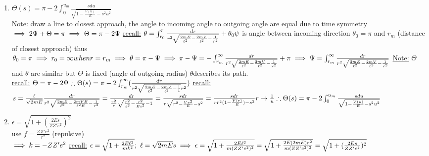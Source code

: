 \documentclass[12pt]{amsart}
\begin{document}
\begin{enumerate}
\item \underline{$\Theta (s) = \pi - 2 \int_0^{u_m} \frac{s du}{\sqrt{1- \frac{V(u)}{E} - s^2 u^2}}$}\\
\underline{Note:} draw a line to closest approach, the angle to incoming angle to outgoing angle are equal due to time symmetry\\
$\implies 2 \Psi + \Theta = \pi \implies \Theta = \pi - 2 \Psi\\$
\underline{recall:} $\theta = \int_{r_0}^r \frac{dr}{r^2 \sqrt{ \frac{2 m E}{\ell^2} - \frac{2 m V}{\ell^2} - \frac{1}{r^2}}}+ \theta_0\\
\psi$ is angle between incoming direction $\theta_0 = \pi$ and $r_m$ (distance of closest approach) thus\\
$\theta_0 = \pi \implies r_0 = \infty when r = r_m \implies \theta = \pi-\Psi\\
\implies \pi - \Psi = - \int_{r_m}^{\infty} \frac{dr}{r^2 \sqrt{ \frac{2 m E}{\ell^2} - \frac{2 m V}{\ell^2} - \frac{1}{r^2}}} + \pi\\
\implies \Psi = \int_{r_m}^{\infty} \frac{dr}{r^2 \sqrt{ \frac{2 m E}{\ell^2} - \frac{2 m V}{\ell^2} - \frac{1}{r^2}}}\\$
\underline{Note:} $\Theta$ and $\theta$ are similar but $\Theta$ is fixed (angle of outgoing radius) $\theta $describes its path.\\
\underline{recall:} $\Theta = \pi - 2 \Psi\\
\therefore \Theta(s) = \pi - 2 \int_{r_m}^{\infty} ( \frac{dr}{r^2 \sqrt{\frac{2 mE}{\ell^2} - \frac{2 m V}{\ell^2} - \frac[1}{r^2}})\\$
\underline{recall:} $s= \frac{\ell}{\sqrt{2 m E}}\\
\frac{dr}{r^2 \sqrt{ \frac{2 mE}{\ell^2} -  \frac{2 m V E}{\ell^2 E} - \frac{1}{r^2}}} = \frac{dr}{\frac{r^2}{r} \sqrt{ \frac{r^2}{s^2} -\frac{r^2}{E s^2} - 1}}\\
= \frac{s dr}{r \sqrt{r^2 - \frac{V r^2}{E} - s^2}} = \frac{s dr}{r r^2 (1- \frac{V(r)}{E}) - s^2}\\
r \rightarrow \frac{1}{u}\\
\therefore \Theta (s) = \pi - 2 \int_0^{u_m} \frac{s du}{\sqrt{1- \frac{V(u)}{E} - s^2 u^2}}\\$


\hdashrule[0.5ex][c]{\linewidth}{0.5pt}{1.5mm}


\item \underline{$\epsilon = \sqrt{1 + ( \frac{2 E s}{Z Z' e^2})^2}$}\\
use $f = \frac{Z Z' e^2}{r^2}$ (repulsive)\\
$\implies k = - Z Z' e^2\\$
\underline{recall:} $\epsilon = \sqrt{1 + \frac{2 E \ell^2}{m k^2}};\,\, \ell = \sqrt{2 m E} s\\
\implies \epsilon = \sqrt{ 1 + \frac{2 E \ell^2}{m ( Z Z' e^2)^2}} = \sqrt{1 + \frac{2 E ( 2 m E) r^2}{m( Z Z' e^2)^2}}\\
= \sqrt{1 + ( \frac{2 E s}{Z Z' e^2})^2}\\$



\end{enumerate}
\end{document}
